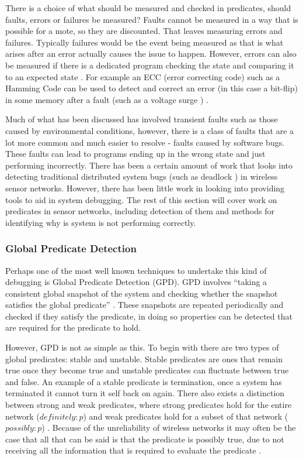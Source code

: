 There is a choice of what should be measured and checked in predicates, should faults, errors or failures be measured? Faults cannot be measured \cite{?} in a way that is possible for a mote, so they are discounted. That leaves measuring errors and failures. Typically failures would be the event being measured \cite{?} as that is what arises after an error actually causes the issue to happen. However, errors can also be measured if there is a dedicated program checking the state and comparing it to an expected state \cite{?}. For example an ECC (error correcting code) such as a Hamming Code can be used to detect and correct an error (in this case a bit-flip) in some memory after a fault (such as a voltage surge ) \cite{hamming1950error}.

Much of what has been discussed has involved transient faults such as those caused by environmental conditions, however, there is a class of faults that are a lot more common and much easier to resolve - faults caused by software bugs. These faults can lead to programs ending up in the wrong state and just performing incorrectly. There has been a certain amount of work that looks into detecting traditional distributed system bugs (such as deadlock \cite{?}) in wireless sensor networks. However, there has been little work in looking into providing tools to aid in system debugging. The rest of this section will cover work on predicates in sensor networks, including detection of them and methods for identifying why is system is not performing correctly.


\subsubsection{Global Predicate Detection}

Perhaps one of the most well known techniques to undertake this kind of debugging is Global Predicate Detection (GPD). GPD involves ``taking a consistent global snapshot of the system and checking whether the snapshot satisfies the global predicate'' \cite{277788}. These snapshots are repeated periodically and checked if they satisfy the predicate, in doing so properties can be detected that are required for the predicate to hold.

However, GPD is not as simple as this. To begin with there are two types of global predicates: stable and unstable. Stable predicates are ones that remain true once they become true \cite{277788} and unstable predicates can fluctuate between true and false. An example of a stable predicate is termination, once a system has terminated it cannot turn it self back on again. There also exists a distinction between strong and weak predicates, where strong predicates hold for the entire network ($definitely : p$) and weak predicates hold for a subset of that network ($possibly : p$) \cite{553309,345831}. Because of the unreliability of wireless networks it may often be the case that all that can be said is that the predicate is possibly true, due to not receiving all the information that is required to evaluate the predicate \cite{?}.


